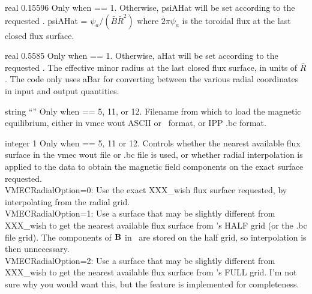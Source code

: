 \myhrule

{real}
{0.15596}
{Only when  == 1. Otherwise, {\ttfamily psiAHat} will be set according to the requested .}
{{\ttfamily psiAHat} = $\psi_a / (\bar{B} \bar{R}^2)$
where $2 \pi \psi_a$ is the toroidal flux at the last closed flux surface.}

\myhrule

{real}
{0.5585}
{Only when  == 1. Otherwise, {\ttfamily aHat} will be set according to the requested .}
{The effective minor radius at the last closed flux surface, in units of $\bar{R}$.
The code only uses {\ttfamily aBar} for converting between the various radial coordinates in input and output quantities.
}

\myhrule

{string}
{``''}
{Only when  == 5, 11, or 12.}
{Filename from which to load the magnetic equilibrium, either in {\ttfamily vmec wout} ASCII or \netCDF~format, or IPP {\ttfamily .bc} format.}

\myhrule

{integer}
{1}
{Only when  == 5, 11 or 12.}
{Controls whether the nearest available flux surface in the {\ttfamily
    vmec wout} file or .bc file is used, or whether radial interpolation is applied to the data
to obtain the magnetic field components on the exact surface requested.\\

{\ttfamily VMECRadialOption}=0: Use the exact {\ttfamily XXX\_wish} flux surface requested, by interpolating from the radial grid.\\

{\ttfamily VMECRadialOption}=1: Use a surface that may be slightly
different from {\ttfamily XXX\_wish} to get the nearest available flux
surface from \vmec's HALF grid (or the .bc file grid).  
   The components of ${\mathbf B}$ in \vmec~are stored on the half grid, so interpolation is then unnecessary.\\

{\ttfamily VMECRadialOption}=2: Use a surface that may be slightly different from {\ttfamily XXX\_wish} to get the nearest available flux surface from \vmec's FULL grid.
I'm not sure why you would want this, but the feature is implemented for completeness.
}

\myhrule

